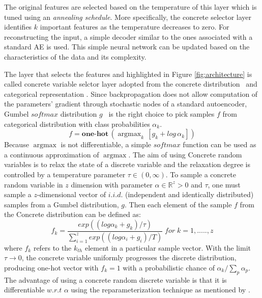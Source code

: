 \documentclass{bioinfo}
\newcommand{\R}{\mathbb{R}}
\DeclareMathOperator*{\argmax}{argmax}
\begin{document}
The original features are selected based on the temperature of this layer which is tuned using an \emph{annealing schedule}. More specifically, the concrete selector layer identifies $k$ important features as the temperature decreases to zero. 
For reconstructing the input, a simple decoder similar to the ones associated with a standard AE is used. 
This simple neural network can be updated based on the characteristics of the data and its complexity.

The layer that selects the features and highlighted in Figure \ref{fig:architecture} is called concrete variable selctor layer adopted from the concrete distribution~\citep{maddison2016concrete} and categorical representation \citep{jang2016categorical}. 
Since backpropagation does not allow computation of the parameters' gradient through stochastic nodes of a standard autoencoder, Gumbel $softmax$ distribution $g$~\citep{gumbel1954statistical} is the right choice to pick samples $f$ from categorical distribution with class probabilities $\alpha_k$. 
\begin{equation}
	f = \textbf{one-hot} \, (\argmax_k \, [g_k + log \, \alpha_k])
\end{equation}
Because $\argmax$ is not differentiable, a simple $softmax$ function can be used as a continuous approximation of $\argmax$. The aim of using Concrete random variables is to relax the state of a discrete variable and the relaxation degree is controlled by a temperature parameter $\tau \in (0, \infty)$. To sample a concrete random variable in $z$ dimension with parameter $\alpha \in \R ^z>0$ and $\tau$, one must sample a $z$-dimensional vector of $i.i.d.$ (independent and identically distributed) samples from a Gumbel distribution, $g.$ Then each element of the sample $f$ from the Concrete distribution can be defined as:
\begin{equation}
    f_k = \frac{exp((log \alpha_k + g_k)/\tau)}{\sum_{i=1} ^z exp((log \alpha_i + g_i)/T) } \; for \; k = 1,.....,z
\end{equation}
where $f_k$ refers to the $k_{th}$ element in a particular sample vector. 
With the limit $\tau \to 0$, the concrete variable uniformly progresses the discrete distribution, producing one-hot vector with $f_k = 1$ with a probabilistic chance of $\alpha _k/\sum_p \alpha _p$.
The advantage of using a concrete random discrete variable is that it is differentiable $w.r.t$ $\alpha$ using the reparameterization technique as mentioned by \citep{kingma2013auto}.
\end{document}

